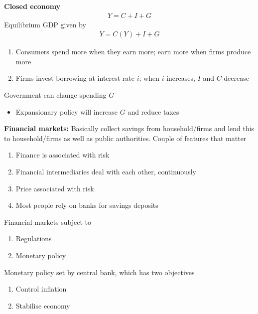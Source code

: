 \documentclass{beamer}
\begin{document}
\begin{frame}
  \textbf{Closed economy}
  \begin{align}
    Y=C+I+G
  \end{align}
  Equilibrium GDP given by
  \begin{align}
    Y=C(Y) + I +G
  \end{align}
  \begin{enumerate}
    \item Consumers spend more when they earn more; earn more when firms produce more
    \item Firms invest borrowing at interest rate $i$; when $i$ increases, $I$ and $C$ decrease 
  \end{enumerate}
  Government can change spending $G$
  \begin{itemize}
    \item Expansionary policy will increase $G$ and reduce taxes
  \end{itemize}
\end{frame}

\begin{frame}
  \textbf{Financial markets:} Basically collect savings from household/firms and lend this to household/firms as well as public authorities.
  Couple of features that matter
  \begin{enumerate}
    \item Finance is associated with risk
    \item Financial intermediaries deal with each other, continuously
    \item Price associated with risk
    \item Most people rely on banks for savings deposits
  \end{enumerate}
\end{frame}

\begin{frame}
  Financial markets subject to 
  \begin{enumerate}
    \item Regulations
    \item Monetary policy
  \end{enumerate}
  Monetary policy set by central bank, which has two objectives
  \begin{enumerate}
    \item Control inflation
    \item Stabilise economy
  \end{enumerate}  
\end{frame}
\end{document}
